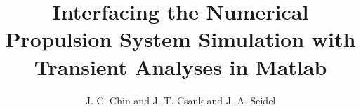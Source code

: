 \documentclass[]             %
{NASA}                       %
\title{Interfacing the Numerical Propulsion System Simulation with Transient Analyses in Matlab}
\author{J. C. Chin and J. T. Csank and J. A. Seidel} %
\begin{document}
\tableofcontents
\listoffigures
\listoftables




\cite{Turbofan}
\cite{NonlinearDynamic}
\cite{MatlabOOP}
\cite{Volume Dynamic}
\cite{TTECTrA}
\cite{NPSS}




\end{document}
